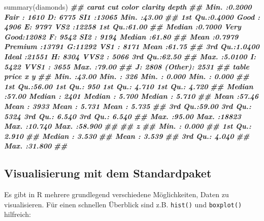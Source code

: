 \documentclass[11pt,german,a4paper]{article}
\newenvironment{Shaded}{\begin{snugshade}}{\end{snugshade}}
\newcommand{\DocumentationTok}[1]{\textcolor[rgb]{0.56,0.35,0.01}{\textbf{\textit{#1}}}}
\newcommand{\FunctionTok}[1]{\textcolor[rgb]{0.00,0.00,0.00}{#1}}
\newcommand{\NormalTok}[1]{#1}
\begin{document}
\begin{Shaded}
\begin{Highlighting}[]
\FunctionTok{summary}\NormalTok{(diamonds)}
\DocumentationTok{\#\#      carat               cut        color        clarity          depth      }
\DocumentationTok{\#\#  Min.   :0.2000   Fair     : 1610   D: 6775   SI1    :13065   Min.   :43.00  }
\DocumentationTok{\#\#  1st Qu.:0.4000   Good     : 4906   E: 9797   VS2    :12258   1st Qu.:61.00  }
\DocumentationTok{\#\#  Median :0.7000   Very Good:12082   F: 9542   SI2    : 9194   Median :61.80  }
\DocumentationTok{\#\#  Mean   :0.7979   Premium  :13791   G:11292   VS1    : 8171   Mean   :61.75  }
\DocumentationTok{\#\#  3rd Qu.:1.0400   Ideal    :21551   H: 8304   VVS2   : 5066   3rd Qu.:62.50  }
\DocumentationTok{\#\#  Max.   :5.0100                     I: 5422   VVS1   : 3655   Max.   :79.00  }
\DocumentationTok{\#\#                                     J: 2808   (Other): 2531                  }
\DocumentationTok{\#\#      table           price             x                y         }
\DocumentationTok{\#\#  Min.   :43.00   Min.   :  326   Min.   : 0.000   Min.   : 0.000  }
\DocumentationTok{\#\#  1st Qu.:56.00   1st Qu.:  950   1st Qu.: 4.710   1st Qu.: 4.720  }
\DocumentationTok{\#\#  Median :57.00   Median : 2401   Median : 5.700   Median : 5.710  }
\DocumentationTok{\#\#  Mean   :57.46   Mean   : 3933   Mean   : 5.731   Mean   : 5.735  }
\DocumentationTok{\#\#  3rd Qu.:59.00   3rd Qu.: 5324   3rd Qu.: 6.540   3rd Qu.: 6.540  }
\DocumentationTok{\#\#  Max.   :95.00   Max.   :18823   Max.   :10.740   Max.   :58.900  }
\DocumentationTok{\#\#                                                                   }
\DocumentationTok{\#\#        z         }
\DocumentationTok{\#\#  Min.   : 0.000  }
\DocumentationTok{\#\#  1st Qu.: 2.910  }
\DocumentationTok{\#\#  Median : 3.530  }
\DocumentationTok{\#\#  Mean   : 3.539  }
\DocumentationTok{\#\#  3rd Qu.: 4.040  }
\DocumentationTok{\#\#  Max.   :31.800  }
\DocumentationTok{\#\# }
\end{Highlighting}
\end{Shaded}

\hypertarget{visualisierung-mit-dem-standardpaket}{%
\subsection{Visualisierung mit dem Standardpaket}\label{visualisierung-mit-dem-standardpaket}}

Es gibt in R mehrere grundlegend verschiedene Möglichkeiten, Daten zu visualisieren. Für einen schnellen Überblick sind z.B. \texttt{hist()} und \texttt{boxplot()} hilfreich:
\end{document}
